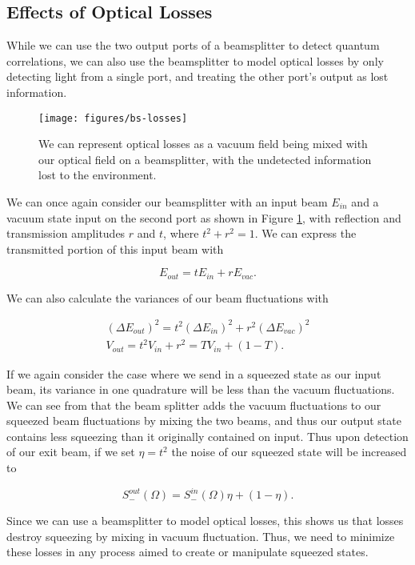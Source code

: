 \subsection{Effects of Optical Losses} 
\label{effects_of_optical_losses} 

While we can use the two output ports of a beamsplitter to detect quantum correlations, we can also use the beamsplitter to model optical losses by only detecting light from a single port, and treating the other port's output as lost information.


\begin{figure}[!ht] 
 \centering 
 \texttt{[image: figures/bs-losses]}   
 \caption[Beamsplitter model of optical losses]{We can represent optical
losses as a vacuum field being mixed with our optical field on a beamsplitter,
with the undetected information lost to the environment.} 
 \label{fig:beamsplitter_losses} 
\end{figure}

We can once again consider our beamsplitter with an input beam $E_{in}$ and a vacuum state input on the second port as shown in Figure \ref{fig:beamsplitter_losses}, with reflection and transmission amplitudes $r$ and $t$, where $t^2+r^2 = 1$.  We can express the transmitted portion of this input beam with

\begin{equation}
  \label{eq:bs_transmitted}
  E_{out} = t E_{in} + r E_{vac}.
\end{equation}

\noindent
We can also calculate the variances of our beam fluctuations with

\begin{eqnarray}
  \label{eq:bs_transmitted_variances}
  (\Delta E_{out})^2 = t^2(\Delta E_{in})^2 + r^2 (\Delta E_{vac})^2 \\  
  V_{out} = t^2V_{in} + r^2 = TV_{in} + (1- T).
\end{eqnarray}

\noindent
If we again consider the case where we send in a squeezed state as our input beam, its variance in one quadrature will be less than the vacuum fluctuations.  We can see from  that the beam splitter adds the vacuum fluctuations to our squeezed beam fluctuations by mixing the two beams, and thus our output state contains less squeezing than it originally contained on input.  Thus upon detection of our exit beam, if we set $\eta=t^2$ the noise of our squeezed state will be increased to \cite{fabre1989noise} 
 
\begin{equation}
  \label{eq:sqz_noise_increase}
  S^{out}_{-}(\Omega ) = S^{in}_{-}(\Omega ) \eta + (1 - \eta).
\end{equation}

\noindent
Since we can use a beamsplitter to model optical losses, this shows us that losses destroy squeezing by mixing in vacuum fluctuation.  Thus, we need to minimize these losses in any process aimed to create or manipulate squeezed states.
